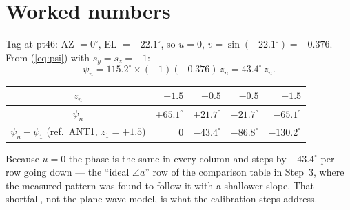 \documentclass[11pt,a4paper]{article}
\begin{document}
\section{Worked numbers}
Tag at pt46: AZ $= 0^\circ$, EL $= -22.1^\circ$, so $u = 0$, $v = \sin(-22.1^\circ) = -0.376$. From (\ref{eq:psi}) with $s_y = s_z = -1$:
\[
  \psi_n = 115.2^\circ \times (-1)(-0.376)\, z_n = 43.4^\circ\, z_n .
\]
\begin{center}
\begin{tabular}{crrrr}
\toprule
$z_n$ & $+1.5$ & $+0.5$ & $-0.5$ & $-1.5$ \\
\midrule
$\psi_n$ & $+65.1^\circ$ & $+21.7^\circ$ & $-21.7^\circ$ & $-65.1^\circ$ \\
$\psi_n - \psi_1$ (ref.\ ANT1, $z_1 = +1.5$) & $0$ & $-43.4^\circ$ & $-86.8^\circ$ & $-130.2^\circ$ \\
\bottomrule
\end{tabular}
\end{center}
Because $u = 0$ the phase is the same in every column and steps by $-43.4^\circ$ per row going down --- the ``ideal $\angle a$'' row of the comparison table in Step~3, where the measured pattern was found to follow it with a shallower slope. That shortfall, not the plane-wave model, is what the calibration steps address.
\end{document}
